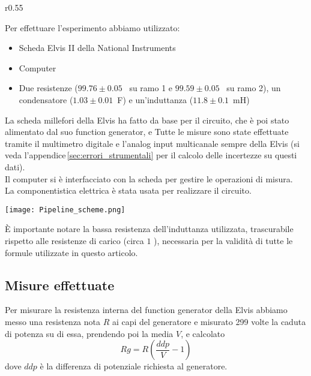 \documentclass[../Relazione_circuiti]{subfiles}
\begin{document}
\begin{wrapfigure}{r}{0.55\textwidth}

\end{wrapfigure}

\begin{minipage}{.44\textwidth}

  Per effettuare l'esperimento abbiamo utilizzato:
  \begin{itemize}
    \item Scheda Elvis II della National Instruments
    \item Computer
    \item Due resistenze ($99.76 \pm 0.05$~\textOmega \hspace{1pt} su ramo 1 e $99.59 \pm 0.05$~\textOmega \hspace{1pt} su ramo 2), un condensatore ($1.03 \pm 0.01 $~\textmu F) e un'induttanza ($11.8 \pm 0.1$~mH)
  \end{itemize}

  La scheda millefori della Elvis ha fatto da base per il circuito, che è poi stato alimentato dal suo function
  generator, e Tutte le misure sono state effettuate tramite il multimetro digitale e l'analog input multicanale sempre
  della Elvis (si veda l'appendice\,\ref{sec:errori_strumentali} per il calcolo delle incertezze su questi dati).\\
  Il computer si è interfacciato con la scheda per gestire le operazioni di misura. \\
  La componentistica elettrica è stata usata per realizzare il circuito.
\end{minipage}
\hfill
\begin{minipage}{0.55\textwidth}
  \centering
  \texttt{[image: Pipeline\_scheme.png]}
\end{minipage}
È importante notare la bassa resistenza dell'induttanza utilizzata, trascurabile rispetto alle resistenze di carico
(circa $1$ \textOmega), necessaria per la validità di tutte le formule utilizzate in questo articolo.

\subsection{Misure effettuate}\label{subsec:misure-effettuate}

  Per misurare la resistenza interna del function generator della Elvis abbiamo messo una resistenza nota $R$ ai capi
  del generatore e misurato 299 volte la caduta di potenza su di essa, prendendo poi la media $V$, e calcolato
  \begin{equation*}
    Rg = R \left( \frac{ddp}{V} - 1 \right)
  \end{equation*}
  dove $ddp$ è la differenza di potenziale richiesta al generatore. \\
\end{document}

